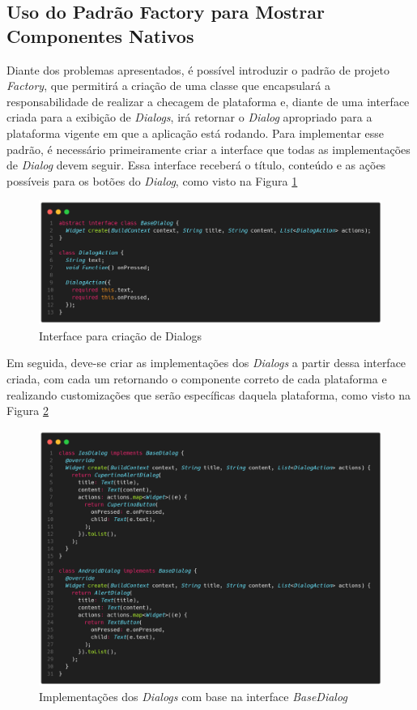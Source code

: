\documentclass[12pt, %
openright, 
oneside, %
a4paper,    %
brazil]{facom-ufu-abntex2}
\begin{document}
\subsection{Uso do Padrão Factory para Mostrar Componentes Nativos}

Diante dos problemas apresentados, é possível introduzir o padrão de projeto \textit{Factory}, que permitirá a criação de uma classe que encapsulará a responsabilidade de realizar a checagem de plataforma e, diante de uma interface criada para a exibição de \textit{Dialogs}, irá retornar o \textit{Dialog} apropriado para a plataforma vigente em que a aplicação está rodando. Para implementar esse padrão, é necessário primeiramente criar a interface que todas as implementações de \textit{Dialog} devem seguir. Essa interface receberá o título, conteúdo e as ações possíveis para os botões do \textit{Dialog}, como visto na Figura \ref{fig:base_dialog}

\begin{figure}[ht]
    \centering
    \includegraphics[width=.85\textwidth, trim={0 30 0 100}, clip]{figures/dialog/base_dialog.png}
    \caption{Interface para criação de Dialogs}
    \label{fig:base_dialog}
\end{figure}

Em seguida, deve-se criar as implementações dos \textit{Dialogs} a partir dessa interface criada, com cada um retornando o componente correto de cada plataforma e realizando customizações que serão específicas daquela plataforma, como visto na Figura \ref{fig:dialog_implementations}


\begin{figure}[ht]
    \centering
    \includegraphics[width=.85\textwidth, trim={0 30 0 100}, clip]{figures/dialog/dialog_implementations.png}
    \caption{Implementações dos \textit{Dialogs} com base na interface \textit{BaseDialog}}
    \label{fig:dialog_implementations}
\end{figure}
\end{document}
